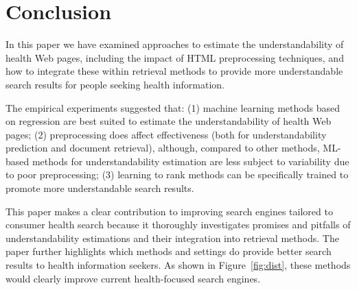 \section{Conclusion}
\label{sec:conclusion_doc_analysis}

In this paper we have examined approaches to estimate the understandability of health Web pages, including the impact of HTML preprocessing techniques, and how to integrate these within retrieval methods to provide more understandable search results for people seeking health information. 

The empirical experiments suggested that: (1) machine learning methods based on regression are best suited to estimate the understandability of health Web pages; (2) preprocessing does affect effectiveness (both for understandability prediction and document retrieval), although, compared to other methods, ML-based methods for understandability estimation are less subject to variability due to poor preprocessing; (3) learning to rank methods can be specifically trained to promote more understandable search results. 

This paper makes a clear contribution to improving search engines tailored to consumer health search because it thoroughly investigates promises and pitfalls of understandability estimations and their integration into retrieval methods. The paper further highlights which methods and settings do provide better search results to health information seekers. As shown in Figure~\ref{fig:dist}, these methods would clearly improve current health-focused search engines. 


%
%
%



